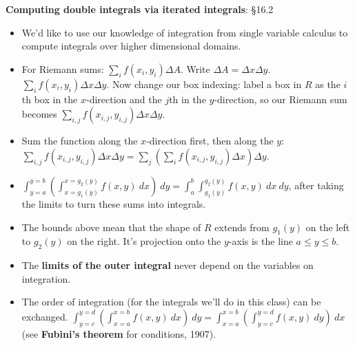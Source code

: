 \documentclass[12pt,letterpaper,noanswers]{exam}
\begin{document}
\noindent\textbf{Computing double integrals via iterated integrals}:  \S 16.2
\begin{tcolorbox}
\begin{itemize}
\itemsep0em
    \item We'd like to use our knowledge of integration from single variable calculus to compute integrals over higher dimensional domains.  
    \item For Riemann sums: $\displaystyle\sum\limits_{i}f(x_{i},y_i)\Delta A$.  Write $\Delta A = \Delta x \Delta y$.  $\displaystyle\sum\limits_{i}f(x_{i},y_i)\Delta x\Delta y$.  Now change our box indexing: label a box in $R$ as the $i$th box in the $x$-direction and the $j$th in the $y$-direction, so our Riemann sum becomes $\displaystyle\sum\limits_{i,j}f(x_{i,j},y_{i,j})\Delta x\Delta y$.
    \item Sum the function along the $x$-direction first, then along the $y$: $\displaystyle\sum\limits_{i,j}f(x_{i,j},y_{i,j})\Delta x\Delta y = \displaystyle\sum\limits_{j}\left(\sum\limits_{i}f(x_{i,j},y_{i,j})\Delta x\right)\Delta y$.
    \item  $\displaystyle\int_{y=a}^{y=b}\left(\int_{x=g_1(y)}^{x=g_2(y)}f(x,y)\ dx \right)\ dy = \int_{a}^{b}\int_{g_1(y)}^{g_2(y)}f(x,y)\ dx \ dy$, after taking the limits to turn these sums into integrals.
    \item The bounds above mean that the shape of $R$ extends from $g_1(y)$ on the left to $g_2(y)$ on the right.  It's projection onto the $y$-axis is the line $a\leq y \leq b$.
    \item The \textbf{limits of the outer integral} never depend on the variables on integration.
    \item The order of integration (for the integrals we'll do in this class) can be exchanged. $\displaystyle\int_{y=c}^{y=d}\left(\int_{x=a}^{x=b}f(x,y)\ dx\right)\ dy = \int_{x=a}^{x=b}\left(\int_{y=c}^{y=d}f(x,y)\ dy\right)\ dx$ (see \textbf{Fubini's theorem} for conditions, 1907).
\end{itemize}
\end{tcolorbox}



\end{document}
